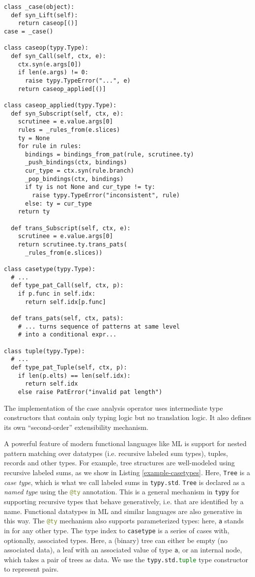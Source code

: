 \documentclass[preprint,10pt]{sigplanconf}
\newcommand{\lip}[1]{\lstinline[language=Python,basicstyle=\ttfamily\small,deletendkeywords={tuple,buffer,map}]{#1}}
\begin{document}
\begin{codelisting}[t]
\begin{lstlisting}
class _case(object):
  def syn_Lift(self):
    return caseop[()]
case = _case()

class caseop(typy.Type):
  def syn_Call(self, ctx, e):
    ctx.syn(e.args[0])
    if len(e.args) != 0:
      raise typy.TypeError("...", e)
    return caseop_applied[()]

class caseop_applied(typy.Type):
  def syn_Subscript(self, ctx, e):
    scrutinee = e.value.args[0]
    rules = _rules_from(e.slices)
    ty = None
    for rule in rules:
      bindings = bindings_from_pat(rule, scrutinee.ty)
      _push_bindings(ctx, bindings)
      cur_type = ctx.syn(rule.branch)
      _pop_bindings(ctx, bindings)
      if ty is not None and cur_type != ty:
        raise typy.TypeError("inconsistent", rule)
      else: ty = cur_type
    return ty

  def trans_Subscript(self, ctx, e):
    scrutinee = e.value.args[0]
    return scrutinee.ty.trans_pats(
      _rules_from(e.slices))

class casetype(typy.Type):
  # ...
  def type_pat_Call(self, ctx, p):
    if p.func in self.idx: 
      return self.idx[p.func]

  def trans_pats(self, ctx, pats):
    # ... turns sequence of patterns at same level 
    # into a conditional expr...

class tuple(typy.Type):
  # ...
  def type_pat_Tuple(self, ctx, p):
    if len(p.elts) == len(self.idx):
      return self.idx
    else raise PatError("invalid pat length") 
\end{lstlisting}
\caption{The implementation of the case analysis operator uses intermediate type constructors that contain only typing logic but no translation logic. It also defines its own ``second-order'' extensibility mechanism.}
\label{example-casetypes-impl}
\end{codelisting}
A powerful feature of modern functional languages like ML is support for nested pattern matching over datatypes (i.e. recursive labeled sum types), tuples, records and other types. For example, tree structures are well-modeled using recursive labeled sums, as we show in Listing \ref{example-casetypes}. Here, \lip{Tree} is a \emph{case type}, which is what we call labeled sums in \lip{typy.std}. \lip{Tree} is declared as a \emph{named type} using the \lip{@ty} annotation. This is a general mechanism in \lip{typy} for supporting recursive types that behave generatively, i.e. that are identified by a name. Functional datatypes in ML and similar languages are also generative in this way. The \lip{@ty} mechanism also supports parameterized types: here, \lip{a} stands in for any other type. The type index to \lip{casetype} is a series of cases with, optionally, associated types. Here, a (binary) tree can either be empty (no associated data), a leaf with an associated value of type \lip{a}, or an internal node, which takes a pair of trees as data. We use the \lip{typy.std.tuple} type constructor to represent pairs.
\end{document}
